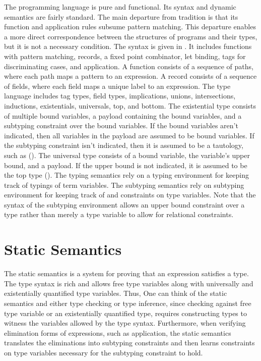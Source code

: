 \documentclass[acmsmall]{acmart}
\theoremstyle{definition}
\begin{document}
The programming language is pure and functional. Its syntax and dynamic semantics 
are fairly standard. The main departure from tradition is that its function
and application rules subsume pattern matching. This departure enables a more direct  
correspondence between the structures of programs and their types, but it is 
not a necessary condition.
The syntax is given in .
It includes functions with pattern matching, records, a fixed point combinator, let binding, 
tags for discriminating cases, and application.
A function consists of a sequence of paths, where each path maps a pattern to an expression.
A record consists of a sequence of fields, where each field maps a unique label to an expression. 
The type language includes tag types, field types, implications, unions, intersections, 
inductions, existentials, universals, top, and bottom. 
The existential type consists of multiple bound variables, a payload containing the bound variables, 
and a subtyping constraint over the bound variables. 
If the bound variables aren't indicated, then all variables in the payload are
assumed to be bound variables. If the subtyping constraint isn't indicated, then it is assumed to 
be a tautology, such as ().
The universal type consists of a bound variable, the variable's upper bound, and a payload. If the upper
bound is not indicated, it is assumed to be the top type ().
The typing semantics rely on a typing environment for keeping track of typings of term variables.
The subtyping semantics rely on subtyping environment for keeping track of and constraints on type variables. 
Note that the syntax of the subtyping environment allows an upper bound constraint over a type
rather than merely a type variable to allow for relational constraints. 



\section{Static Semantics}
The static semantics is a system for proving that an expression satisfies a type.
The type syntax is rich and allows free type variables along with universally and existentially quantified type variables. Thus,  
One can think of the static semantics and either type checking or type inference, since 
checking against free type variable or an existentially quantified type, requires constructing types to witness 
the variables allowed by the type syntax.
Furthermore, when verifying elimination forms of expressions, such as application, the static semantics 
translates the eliminations into subtyping constraints and then learns constraints on type variables
necessary for the subtyping constraint to hold. 
\end{document}
